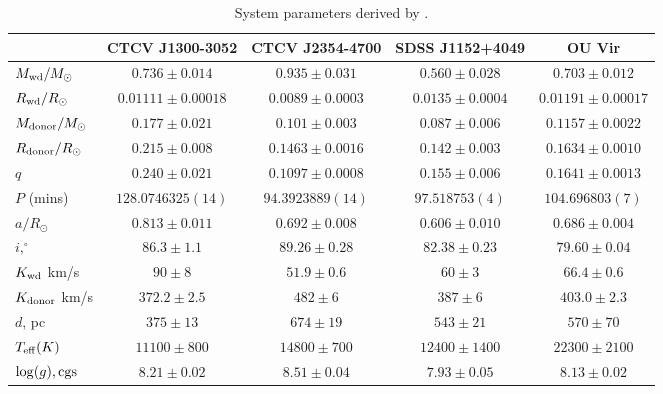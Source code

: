 \begin{landscape}
        \begin{table}
            \centering
            \caption{System parameters derived by \citet{Savoury2011}.}
            \label{table:savoury system params}
            \begin{tabular}{lcccc}
                \hline
                ~                           & {\bf CTCV J1300-3052} & {\bf CTCV J2354-4700} & {\bf SDSS J1152+4049} & {\bf OU Vir}      \\
                \hline
                \hline
                $M_{\rm wd}/M_{\odot}$      & $0.736\pm0.014$       & $0.935\pm0.031$       & $0.560\pm0.028$   & $0.703\pm0.012$       \\
                $R_{\rm wd}/R_{\odot}$      & $0.01111\pm0.00018$   & $0.0089\pm0.0003$     & $0.0135\pm0.0004$ & $0.01191\pm0.00017$   \\
                $M_{\rm donor}/M_{\odot}$   & $0.177\pm0.021$       & $0.101\pm0.003$       & $0.087\pm0.006$   & $0.1157\pm0.0022$     \\
                $R_{\rm donor}/R_{\odot}$   & $0.215\pm0.008$       & $0.1463\pm0.0016$     & $0.142\pm0.003$   & $0.1634\pm0.0010$     \\
                $q$                         & $0.240\pm0.021$       & $0.1097\pm0.0008$     & $0.155\pm0.006$   & $0.1641\pm0.0013$     \\
                \hline
                $P$ (mins)                  & $128.0746325(14)$     & $94.3923889(14)$      & $97.518753(4)$    & $104.696803(7)$       \\
                $a/R_{\odot}$               & $0.813\pm0.011$       & $0.692\pm0.008$       & $0.606\pm0.010$   & $0.686\pm0.004$       \\
                $i, ^\circ$                 & $86.3\pm1.1$          & $89.26\pm0.28$        & $82.38\pm0.23$    & $79.60\pm0.04$        \\
                $K_{\rm wd}$ km/s           & $90\pm8$              & $51.9\pm0.6$          & $60\pm3$          &  $66.4\pm0.6$         \\
                $K_{\rm donor}$ km/s        & $372.2\pm2.5$         & $482\pm6$             & $387\pm6$         & $403.0\pm2.3$         \\
                \hline
                $d$, pc                     & $375\pm13$            & $674\pm19$            & $543\pm21$        & $570\pm70$            \\
                $T_{\rm eff} (K)$           & $11100\pm800$         & $14800\pm700$         & $12400\pm1400$    & $22300\pm2100$        \\
                $\log(g), {\rm cgs}$        & $8.21\pm0.02$         & $8.51\pm0.04$         & $7.93\pm0.05$     & $8.13\pm0.02$         \\
                \hline
                \hline
            \end{tabular}
        \end{table}


\end{landscape}
